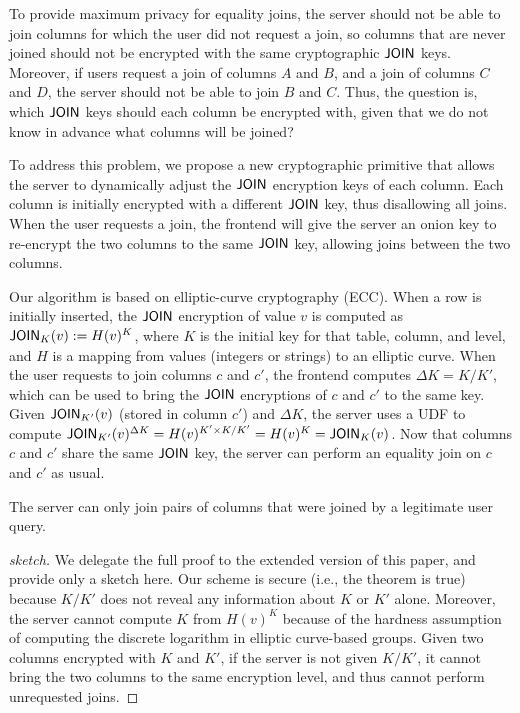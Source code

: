To provide maximum privacy for equality joins, the server should not
be able to join columns for which the user did not request a join,
so columns that are never joined should not be encrypted with the
same cryptographic $\mathsf{JOIN}$ keys.  Moreover, if users request a join
of columns
$A$ and $B$, and a join of columns $C$ and $D$, the server should
not be able to join $B$ and $C$\@.  Thus, the question is, which
$\mathsf{JOIN}$ keys should each column be encrypted with, given that we
do not know in advance what columns will be joined?

To address this problem, we propose a new cryptographic primitive that
allows the server to dynamically adjust the $\mathsf{JOIN}$ encryption keys
of each column.  Each column is initially encrypted with a different
$\mathsf{JOIN}$ key, thus disallowing all joins.  When the user requests a
join, the frontend will give the server an onion key to re-encrypt
the two columns to the same $\mathsf{JOIN}$ key, allowing joins between the
two columns.

Our algorithm is based on elliptic-curve cryptography (ECC).  When
a row is initially inserted, the $\mathsf{JOIN}$ encryption of value $v$
is computed as $\mathsf{JOIN}_K(v) := H(v)^K$, where $K$ is the initial key
for that table, column, and level, and $H$ is a mapping from values
(integers or strings) to an elliptic curve.  When the user requests
to join columns $c$ and $c'$, the frontend computes $\Delta K=K/K'$,
which can be used to bring the $\mathsf{JOIN}$ encryptions of $c$ and $c'$
to the same key.  Given $\mathsf{JOIN}_{K'}(v)$ (stored in column $c'$) and
$\Delta K$, the server uses a UDF to compute $\mathsf{JOIN}_{K'}(v)^{\Delta
K} = H(v)^{K'\times K / K'} = H(v)^K = \mathsf{JOIN}_K(v)$.  Now that columns
$c$ and $c'$ share the same $\mathsf{JOIN}$ key, the server can perform an
equality join on $c$ and $c'$ as usual.

\begin{theorem}
The server can only join pairs of columns that were joined by
a legitimate user query.
\end{theorem}

\begin{proof}[sketch]
We delegate the full proof to the extended version of this paper,
and provide only a sketch here.
Our scheme is secure (i.e., the theorem is true) because $K/K'$ does not reveal any
information about $K$ or $K'$ alone.  Moreover, the server cannot compute
$K$ from $H(v)^K$ because of the hardness assumption of computing the
discrete logarithm in elliptic curve-based groups. Given two columns
encrypted with $K$ and $K'$, if the server is not given $K/K'$, it
cannot bring the two columns to the same encryption level, and thus
cannot perform unrequested joins.
\end{proof}

